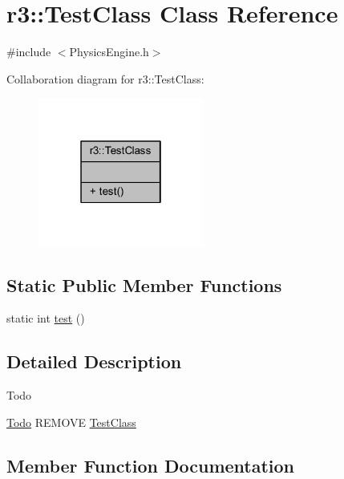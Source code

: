 \hypertarget{classr3_1_1_test_class}{}\section{r3\+:\+:Test\+Class Class Reference}
\label{classr3_1_1_test_class}


{\ttfamily \#include $<$Physics\+Engine.\+h$>$}



Collaboration diagram for r3\+:\+:Test\+Class\+:\nopagebreak
\begin{figure}[H]
\begin{center}
\leavevmode
\includegraphics[width=154pt]{classr3_1_1_test_class__coll__graph}
\end{center}
\end{figure}
\subsection*{Static Public Member Functions}
\begin{DoxyCompactItemize}
\item 
static int \mbox{\hyperlink{classr3_1_1_test_class_a145788f0dab401fd9ffa6b75af82d20a}{test}} ()
\end{DoxyCompactItemize}


\subsection{Detailed Description}
\begin{DoxyRefDesc}{Todo}
\item[\mbox{\hyperlink{todo__todo000001}{Todo}}]R\+E\+M\+O\+VE \mbox{\hyperlink{classr3_1_1_test_class}{Test\+Class}} \end{DoxyRefDesc}


\subsection{Member Function Documentation}
\mbox{\label{classr3_1_1_test_class_a145788f0dab401fd9ffa6b75af82d20a}} 
